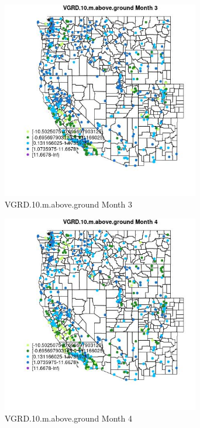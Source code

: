 \begin{figure} 
\centering  
\includegraphics[width=0.77\textwidth]{Code_Outputs/Report_ML_input_PM25_Step4_part_e_de_duplicated_aves_compiled_2019-05-14wNAs_MapObsMo3VGRD10maboveground.jpg} 
\caption{\label{fig:Report_ML_input_PM25_Step4_part_e_de_duplicated_aves_compiled_2019-05-14wNAsMapObsMo3VGRD10maboveground}VGRD.10.m.above.ground Month 3} 
\end{figure} 
 

\begin{figure} 
\centering  
\includegraphics[width=0.77\textwidth]{Code_Outputs/Report_ML_input_PM25_Step4_part_e_de_duplicated_aves_compiled_2019-05-14wNAs_MapObsMo4VGRD10maboveground.jpg} 
\caption{\label{fig:Report_ML_input_PM25_Step4_part_e_de_duplicated_aves_compiled_2019-05-14wNAsMapObsMo4VGRD10maboveground}VGRD.10.m.above.ground Month 4} 
\end{figure} 
 

